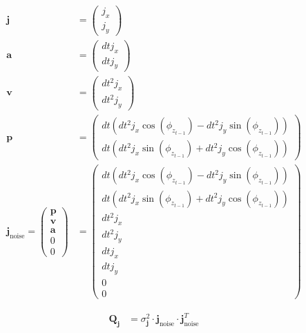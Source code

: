 \documentclass{article}
\begin{document}
\begin{align}
  \textbf{j} &= \left(\begin{matrix}j_{x}\\j_{y}\end{matrix}\right) \\
  \textbf{a} &= \left(\begin{matrix}dt j_{x}\\dt j_{y}\end{matrix}\right) \\
  \textbf{v} &= \left(\begin{matrix}dt^{2} j_{x}\\dt^{2} j_{y}\end{matrix}\right) \\
  \textbf{p} &= \left(\begin{matrix}dt \left(dt^{2} j_{x} \cos{\left(\phi_{z_{t-1}} \right)} - dt^{2} j_{y} \sin{\left(\phi_{z_{t-1}} \right)}\right)\\dt \left(dt^{2} j_{x} \sin{\left(\phi_{z_{t-1}} \right)} + dt^{2} j_{y} \cos{\left(\phi_{z_{t-1}} \right)}\right)\end{matrix}\right) \\
  \textbf{j}_{\textrm{noise}} =
  \left(\begin{matrix}
    \textbf{p} \\
    \textbf{v} \\
    \textbf{a} \\
    0 \\
    0
  \end{matrix}\right) 
&=\left(\begin{matrix}dt \left(dt^{2} j_{x} \cos{\left(\phi_{z_{t-1}} \right)} - dt^{2} j_{y} \sin{\left(\phi_{z_{t-1}} \right)}\right)\\dt \left(dt^{2} j_{x} \sin{\left(\phi_{z_{t-1}} \right)} + dt^{2} j_{y} \cos{\left(\phi_{z_{t-1}} \right)}\right)\\dt^{2} j_{x}\\dt^{2} j_{y}\\dt j_{x}\\dt j_{y}\\0\\0\end{matrix}\right)
\end{align}

\begin{align}
  \textbf{Q}_{\textbf{j}} &= \sigma^2_{\textbf{j}} \cdot \textbf{j}_{\textrm{noise}} \cdot \textbf{j}_{\textrm{noise}}^T
\end{align}
\end{document}
